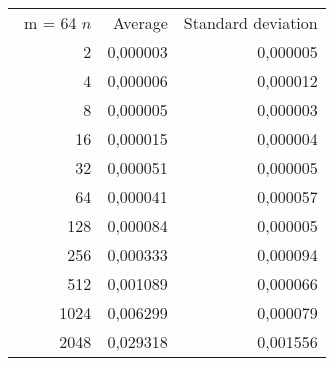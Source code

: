 \begin{tabular}{rrr}\
m = 64
 $n$ & Average & Standard deviation  \\
2 &  0,000003 &  0,000005 \\ 
4 &  0,000006 &  0,000012 \\ 
8 &  0,000005 &  0,000003 \\ 
16 &  0,000015 &  0,000004 \\ 
32 &  0,000051 &  0,000005 \\ 
64 &  0,000041 &  0,000057 \\ 
128 &  0,000084 &  0,000005 \\ 
256 &  0,000333 &  0,000094 \\ 
512 &  0,001089 &  0,000066 \\ 
1024 &  0,006299 &  0,000079 \\ 
2048 &  0,029318 &  0,001556 \\ 
\end{tabular}
